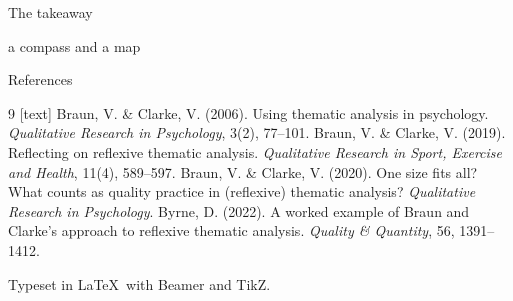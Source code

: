 \begin{frame}{The takeaway}
\vspace{1.2em}
\begin{pullquote}
a compass and a map
\end{pullquote}
\vspace{0.4em}
\begin{center}
\end{center}
\end{frame}

\begin{frame}{References}
\vspace{0.4em}
{\footnotesize
\begin{thebibliography}{9}
[text]
 Braun, V. \& Clarke, V. (2006). Using thematic analysis in
  psychology. \emph{Qualitative Research in Psychology}, 3(2), 77--101.
 Braun, V. \& Clarke, V. (2019). Reflecting on reflexive
  thematic analysis. \emph{Qualitative Research in Sport, Exercise and
  Health}, 11(4), 589--597.
 Braun, V. \& Clarke, V. (2020). One size fits all? What
  counts as quality practice in (reflexive) thematic analysis?
  \emph{Qualitative Research in Psychology}.
 Byrne, D. (2022). A worked example of Braun and Clarke's
  approach to reflexive thematic analysis. \emph{Quality \& Quantity},
  56, 1391--1412.
\end{thebibliography}}
\vspace{0.6em}
\begin{center}{\color{mute}\scriptsize
 Typeset in \LaTeX\ with Beamer and TikZ.}\end{center}
\end{frame}

